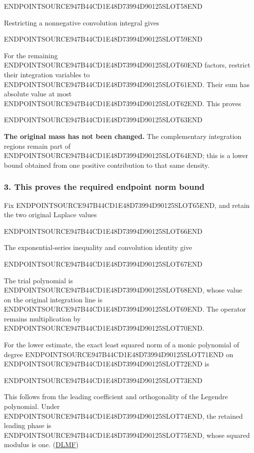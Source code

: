 ENDPOINTSOURCE947B44CD1E48D73994D90125SLOT58END

Restricting a nonnegative convolution integral gives

ENDPOINTSOURCE947B44CD1E48D73994D90125SLOT59END

For the remaining ENDPOINTSOURCE947B44CD1E48D73994D90125SLOT60END factors, restrict their integration variables to ENDPOINTSOURCE947B44CD1E48D73994D90125SLOT61END. Their sum has absolute value at most ENDPOINTSOURCE947B44CD1E48D73994D90125SLOT62END. This proves

ENDPOINTSOURCE947B44CD1E48D73994D90125SLOT63END

\textbf{The original mass has not been changed.} The complementary integration regions remain part of ENDPOINTSOURCE947B44CD1E48D73994D90125SLOT64END; this is a lower bound obtained from one positive contribution to that same density.

\subsubsection{3. This proves the required endpoint norm bound}\label{endpoint-user_norm_original--this-proves-the-required-endpoint-norm-bound}

Fix ENDPOINTSOURCE947B44CD1E48D73994D90125SLOT65END, and retain the two original Laplace values

ENDPOINTSOURCE947B44CD1E48D73994D90125SLOT66END

The exponential-series inequality and convolution identity give

ENDPOINTSOURCE947B44CD1E48D73994D90125SLOT67END

The trial polynomial is ENDPOINTSOURCE947B44CD1E48D73994D90125SLOT68END, whose value on the original integration line is ENDPOINTSOURCE947B44CD1E48D73994D90125SLOT69END. The operator remains multiplication by ENDPOINTSOURCE947B44CD1E48D73994D90125SLOT70END.

For the lower estimate, the exact least squared norm of a monic polynomial of degree ENDPOINTSOURCE947B44CD1E48D73994D90125SLOT71END on ENDPOINTSOURCE947B44CD1E48D73994D90125SLOT72END is

ENDPOINTSOURCE947B44CD1E48D73994D90125SLOT73END

This follows from the leading coefficient and orthogonality of the Legendre polynomial. Under ENDPOINTSOURCE947B44CD1E48D73994D90125SLOT74END, the retained leading phase is ENDPOINTSOURCE947B44CD1E48D73994D90125SLOT75END, whose squared modulus is one. (\href{https://dlmf.nist.gov/18.3}{DLMF})

